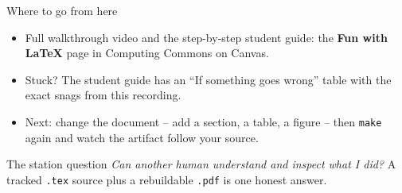 \documentclass[aspectratio=169,11pt]{beamer}
\begin{document}
\begin{frame}{Where to go from here}
\begin{itemize}
  \item Full walkthrough video and the step-by-step student guide: the
    \textbf{Fun with LaTeX} page in Computing Commons on Canvas.
  \item Stuck? The student guide has an ``If something goes wrong'' table with
    the exact snags from this recording.
  \item Next: change the document -- add a section, a table, a figure -- then
    \texttt{make} again and watch the artifact follow your source.
\end{itemize}
\vspace{0.4cm}
\begin{block}{The station question}
\emph{Can another human understand and inspect what I did?} A tracked
\texttt{.tex} source plus a rebuildable \texttt{.pdf} is one honest answer.
\end{block}
\end{frame}
\end{document}
